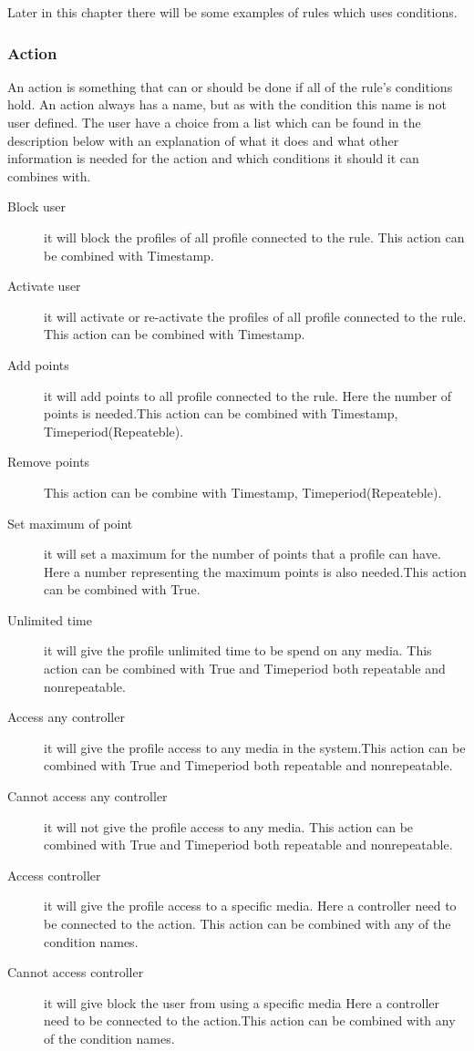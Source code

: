 Later in this chapter there will be some examples of rules which uses conditions.

\subsubsection{Action}
An action is something that can or should be done if all of the rule's conditions hold. An action always has a name, but as with the condition this name is not user defined. The user have a choice from a list which can be found in the description below with an explanation of what it does and what other information is needed for the action and which conditions it should it can combines with.   

\begin{description}
	\item[Block user] it will block the profiles of all profile connected to the rule. This action can be combined with Timestamp.
	\item[Activate user] it will activate or re-activate the profiles of all profile connected to the rule. This action can be combined with Timestamp.
	\item[Add points] it will add points to all profile connected to the rule. Here the number of points is needed.This action can be combined with Timestamp, Timeperiod(Repeateble).
	\item[Remove points]    This action can be combine with Timestamp, Timeperiod(Repeateble).
	\item[Set maximum of point] it will set a maximum for the number of points that a profile can have. Here a number representing the maximum points is also needed.This action can be combined with True.
	\item[Unlimited time] it will give the profile unlimited time to be spend on any media. This action can be combined with True and Timeperiod both repeatable and nonrepeatable.
	\item[Access any controller] it will give the profile access to any media in the system.This action can be combined with True and Timeperiod both repeatable and nonrepeatable.
	\item[Cannot access any controller] it will not give the profile access to any media. This action can be combined with True and Timeperiod both repeatable and nonrepeatable.
	\item[Access controller] it will give the profile access to a specific media. Here a controller need to be connected to the action. This action can be combined with any of the condition names.
	\item[Cannot access controller] it will give block the user from using a specific media Here a controller need to be connected to the action.This action can be combined with any of the condition names.
\end{description}
		

